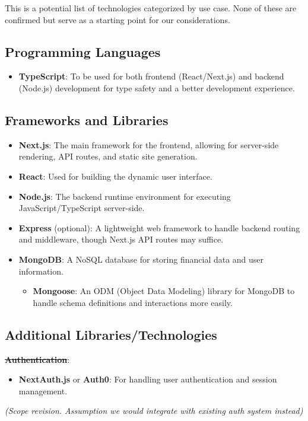 \documentclass{article}
\begin{document}
This is a potential list of technologies categorized by use case. None of these are confirmed but serve as a starting point for our considerations.

\subsection{Programming Languages}
\begin{itemize}
  \item \textbf{TypeScript}: To be used for both frontend (React/Next.js) and backend (Node.js) development for type safety and a better development experience.
\end{itemize}

\subsection{Frameworks and Libraries}
\begin{itemize}
  \item \textbf{Next.js}: The main framework for the frontend, allowing for server-side rendering, API routes, and static site generation.
  \item \textbf{React}: Used for building the dynamic user interface.
  \item \textbf{Node.js}: The backend runtime environment for executing JavaScript/TypeScript server-side.
  \item \textbf{Express} (optional): A lightweight web framework to handle backend routing and middleware, though Next.js API routes may suffice.
  \item \textbf{MongoDB}: A NoSQL database for storing financial data and user information.
  \begin{itemize}
    \item \textbf{Mongoose}: An ODM (Object Data Modeling) library for MongoDB to handle schema definitions and interactions more easily.
  \end{itemize}
\end{itemize}

\subsection{Additional Libraries/Technologies}

{\color{red}%
  \sout {\textbf{Authentication}}:
    \begin{itemize}
      \item \textbf{NextAuth.js} or \textbf{Auth0}: For handling user authentication and session management.
    \end{itemize}
    \emph{(Scope revision. Assumption we would integrate with existing auth system instead)}%
}
\end{document}
